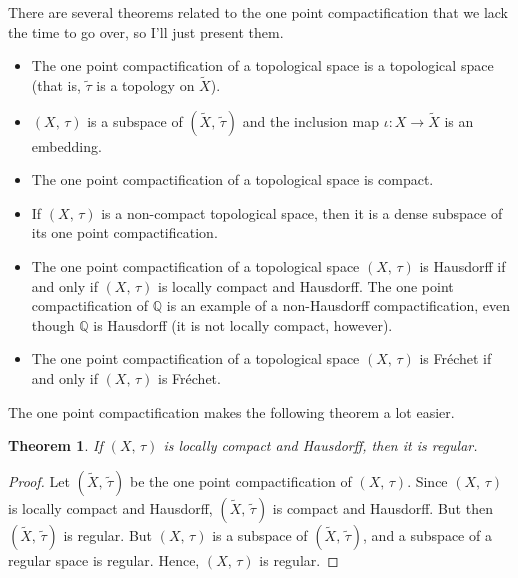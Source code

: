 \documentclass{article}
\theoremstyle{plain}
\newtheorem{theorem}{Theorem}[section]
\theoremstyle{normal}
\begin{document}
        There are several theorems related to the one point compactification
        that we lack the time to go over, so I'll just present them.
        \begin{itemize}
            \item The one point compactification of a topological space is a
                topological space (that is, $\tilde{\tau}$ is a topology on
                $\tilde{X}$).
            \item $(X,\,\tau)$ is a subspace of $(\tilde{X},\,\tilde{\tau})$ and
                the inclusion map $\iota:X\rightarrow\tilde{X}$ is an
                embedding.
            \item The one point compactification of a topological space is
                compact.
            \item If $(X,\,\tau)$ is a non-compact topological space, then it
                is a dense subspace of its one point compactification.
            \item The one point compactification of a topological space
                $(X,\,\tau)$ is Hausdorff if and only if $(X,\,\tau)$ is
                locally compact and Hausdorff. The one point compactification
                of $\mathbb{Q}$ is an example of a non-Hausdorff
                compactification, even though $\mathbb{Q}$ is Hausdorff
                (it is not locally compact, however).
            \item The one point compactification of a topological space
                $(X,\,\tau)$ is Fr\'{e}chet if and only if
                $(X,\,\tau)$ is Fr\'{e}chet.
        \end{itemize}
        The one point compactification makes the following theorem a lot easier.
        \begin{theorem}
            If $(X,\,\tau)$ is locally compact and Hausdorff, then it is
            regular.
        \end{theorem}
        \begin{proof}
            Let $(\tilde{X},\,\tilde{\tau})$ be the one point compactification
            of $(X,\,\tau)$. Since $(X,\,\tau)$ is locally compact and
            Hausdorff, $(\tilde{X},\,\tilde{\tau})$ is compact and Hausdorff.
            But then $(\tilde{X},\,\tilde{\tau})$ is regular. But
            $(X,\,\tau)$ is a subspace of $(\tilde{X},\,\tilde{\tau})$, and
            a subspace of a regular space is regular. Hence,
            $(X,\,\tau)$ is regular.
        \end{proof}
\end{document}
